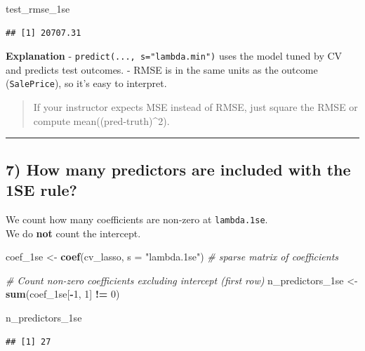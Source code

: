 \documentclass[
]{article}
\newenvironment{Shaded}{\begin{snugshade}}{\end{snugshade}}
\newcommand{\AttributeTok}[1]{\textcolor[rgb]{0.13,0.29,0.53}{#1}}
\newcommand{\CommentTok}[1]{\textcolor[rgb]{0.56,0.35,0.01}{\textit{#1}}}
\newcommand{\DecValTok}[1]{\textcolor[rgb]{0.00,0.00,0.81}{#1}}
\newcommand{\FunctionTok}[1]{\textcolor[rgb]{0.13,0.29,0.53}{\textbf{#1}}}
\newcommand{\NormalTok}[1]{#1}
\newcommand{\OtherTok}[1]{\textcolor[rgb]{0.56,0.35,0.01}{#1}}
\newcommand{\SpecialCharTok}[1]{\textcolor[rgb]{0.81,0.36,0.00}{\textbf{#1}}}
\newcommand{\StringTok}[1]{\textcolor[rgb]{0.31,0.60,0.02}{#1}}
\begin{document}
\begin{Shaded}
\begin{Highlighting}[]
\NormalTok{test\_rmse\_1se}
\end{Highlighting}
\end{Shaded}

\begin{verbatim}
## [1] 20707.31
\end{verbatim}

\textbf{Explanation} - \texttt{predict(...,\ s="lambda.min")} uses the
model tuned by CV and predicts test outcomes. - RMSE is in the same
units as the outcome (\texttt{SalePrice}), so it's easy to interpret.

\begin{quote}
If your instructor expects MSE instead of RMSE, just square the RMSE or
compute mean((pred-truth)\^{}2).
\end{quote}

\begin{center}\rule{0.5\linewidth}{0.5pt}\end{center}

\subsection{7) How many predictors are included with the 1SE
rule?}\label{how-many-predictors-are-included-with-the-1se-rule}

We count how many coefficients are non-zero at \texttt{lambda.1se}.\\
We do \textbf{not} count the intercept.

\begin{Shaded}
\begin{Highlighting}[]
\NormalTok{coef\_1se }\OtherTok{\textless{}{-}} \FunctionTok{coef}\NormalTok{(cv\_lasso, }\AttributeTok{s =} \StringTok{"lambda.1se"}\NormalTok{)  }\CommentTok{\# sparse matrix of coefficients}

\CommentTok{\# Count non{-}zero coefficients excluding intercept (first row)}
\NormalTok{n\_predictors\_1se }\OtherTok{\textless{}{-}} \FunctionTok{sum}\NormalTok{(coef\_1se[}\SpecialCharTok{{-}}\DecValTok{1}\NormalTok{, }\DecValTok{1}\NormalTok{] }\SpecialCharTok{!=} \DecValTok{0}\NormalTok{)}

\NormalTok{n\_predictors\_1se}
\end{Highlighting}
\end{Shaded}

\begin{verbatim}
## [1] 27
\end{verbatim}
\end{document}
